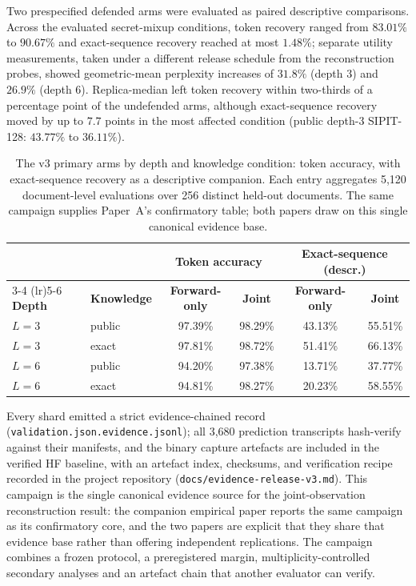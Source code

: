 \documentclass[11pt]{article}
\begin{document}
Two prespecified defended arms were evaluated as paired descriptive comparisons. Across the evaluated secret-mixup conditions, token recovery ranged from $83.01\%$ to $90.67\%$ and exact-sequence recovery reached at most $1.48\%$; separate utility measurements, taken under a different release schedule from the reconstruction probes, showed geometric-mean perplexity increases of $31.8\%$ (depth 3) and $26.9\%$ (depth 6). Replica-median left token recovery within two-thirds of a percentage point of the undefended arms, although exact-sequence recovery moved by up to $7.7$ points in the most affected condition (public depth-3 SIPIT-128: $43.77\%$ to $36.11\%$).

\begin{table}[t]
\centering\small
\caption{The v3 primary arms by depth and knowledge condition: token
accuracy, with exact-sequence recovery as a descriptive companion. Each
entry aggregates 5{,}120 document-level evaluations over 256 distinct
held-out documents. The same campaign supplies Paper~A's confirmatory
table; both papers draw on this single canonical evidence base.}
\label{tab:v3primary}
\begin{tabular}{@{}llcccc@{}}
\toprule
 & & \multicolumn{2}{c}{\textbf{Token accuracy}} &
 \multicolumn{2}{c}{\textbf{Exact-sequence (descr.)}} \\
\cmidrule(lr){3-4} \cmidrule(lr){5-6}
\textbf{Depth} & \textbf{Knowledge} & \textbf{Forward-only} & \textbf{Joint} &
\textbf{Forward-only} & \textbf{Joint} \\
\midrule
$L{=}3$ & public & 97.39\% & 98.29\% & 43.13\% & 55.51\% \\
$L{=}3$ & exact  & 97.81\% & 98.72\% & 51.41\% & 66.13\% \\
$L{=}6$ & public & 94.20\% & 97.38\% & 13.71\% & 37.77\% \\
$L{=}6$ & exact  & 94.81\% & 98.27\% & 20.23\% & 58.55\% \\
\bottomrule
\end{tabular}
\end{table}

Every shard emitted a strict evidence-chained record (\texttt{validation.json.evidence.jsonl}); all 3{,}680 prediction transcripts hash-verify against their manifests, and the binary capture artefacts are included in the verified HF baseline, with an artefact index, checksums, and verification recipe recorded in the project repository (\texttt{docs/evidence-release-v3.md}). This campaign is the single canonical evidence source for the joint-observation reconstruction result: the companion empirical paper reports the same campaign as its confirmatory core, and the two papers are explicit that they share that evidence base rather than offering independent replications. The campaign combines a frozen protocol, a preregistered margin, multiplicity-controlled secondary analyses and an artefact chain that another evaluator can verify.
\end{document}
